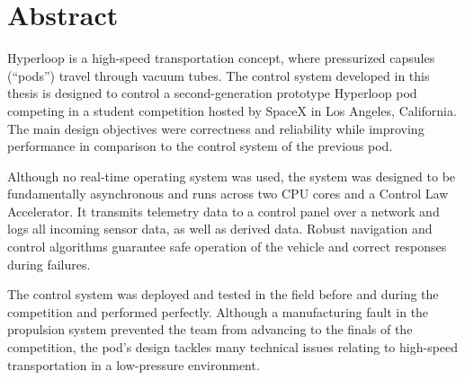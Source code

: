 
\chapter*{Abstract}

Hyperloop is a high-speed transportation concept, where pressurized capsules (“pods”) travel through vacuum tubes. The control system developed in this thesis is designed to control a second-generation prototype Hyperloop pod competing in a student competition hosted by SpaceX in Los Angeles, California. The main design objectives were correctness and reliability while improving performance in comparison to the control system of the previous pod. 

Although no real-time operating system was used, the system was designed to be fundamentally asynchronous and runs across two CPU cores and a Control Law Accelerator. It transmits telemetry data to a control panel over a network and logs all incoming sensor data, as well as derived data. Robust navigation and control algorithms guarantee safe operation of the vehicle and correct responses during failures.

The control system was deployed and tested in the field before and during the competition and performed perfectly. Although a manufacturing fault in the propulsion system prevented the team from advancing to the finals of the competition, the pod's design tackles many technical issues relating to high-speed transportation in a low-pressure environment.
